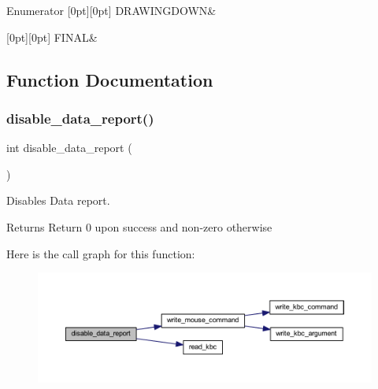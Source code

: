 \begin{DoxyEnumFields}{Enumerator}
[0pt][0pt]{}\mbox{\label{group__mouse_ggadc6e5733fc3c22f0a7b2914188c49c90acc3b3364ddd3d1ff8d1ec4b3a4ccb084}} 
D\+R\+A\+W\+I\+N\+G\+D\+O\+WN&\\
\hline

[0pt][0pt]{}\mbox{\label{group__mouse_ggadc6e5733fc3c22f0a7b2914188c49c90afb43b8264ea4d3dd9957ba1b3fd3f3d5}} 
F\+I\+N\+AL&\\
\hline

\end{DoxyEnumFields}


\subsection{Function Documentation}
\mbox{\label{group__mouse_ga9d37a10902df825a7445faa3261f1a91}} 
\subsubsection{\texorpdfstring{disable\_data\_report()}{disable\_data\_report()}}
{\footnotesize\ttfamily int disable\+\_\+data\+\_\+report (\begin{DoxyParamCaption}{ }\end{DoxyParamCaption})}



Disables Data report. 

\begin{DoxyReturn}{Returns}
Return 0 upon success and non-\/zero otherwise 
\end{DoxyReturn}
Here is the call graph for this function\+:
\nopagebreak
\begin{figure}[H]
\begin{center}
\leavevmode
\includegraphics[width=350pt]{group__mouse_ga9d37a10902df825a7445faa3261f1a91_cgraph}
\end{center}
\end{figure}
\mbox{\label{group__mouse_ga898e9289d77e1290373396a43ee9c53d}} 

